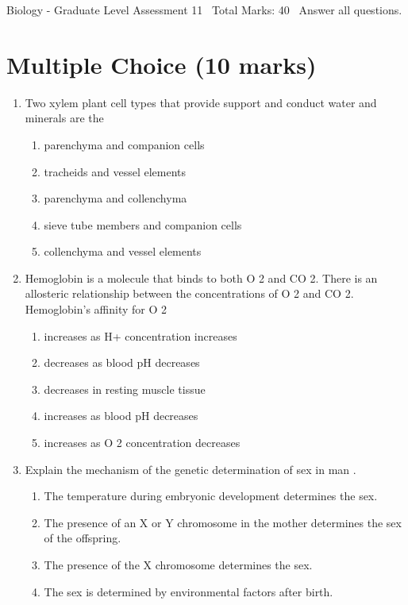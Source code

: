\documentclass[12pt]{article}
\begin{document}
\begin{center}
Biology - Graduate Level Assessment 11 \
Total Marks: 40 \
Answer all questions.
\end{center}

\section*{Multiple Choice (10 marks)}
\begin{enumerate}[label=\arabic*.]
\item Two xylem plant cell types that provide support and conduct water and minerals are the
\begin{enumerate}[label=(\alph*)]
    \item parenchyma and companion cells
    \item tracheids and vessel elements
    \item parenchyma and collenchyma
    \item sieve tube members and companion cells
    \item collenchyma and vessel elements
\end{enumerate}
\item Hemoglobin is a molecule that binds to both O 2 and CO 2. There is an allosteric relationship between the concentrations of O 2 and CO 2. Hemoglobin's affinity for O 2
\begin{enumerate}[label=(\alph*)]
    \item increases as H+ concentration increases
    \item decreases as blood pH decreases
    \item decreases in resting muscle tissue
    \item increases as blood pH decreases
    \item increases as O 2 concentration decreases
\end{enumerate}
\item Explain the mechanism of the genetic determination of sex in man .
\begin{enumerate}[label=(\alph*)]
    \item The temperature during embryonic development determines the sex.
    \item The presence of an X or Y chromosome in the mother determines the sex of the offspring.
    \item The presence of the X chromosome determines the sex.
    \item The sex is determined by environmental factors after birth.

\end{enumerate}
\end{enumerate}
\end{document}
